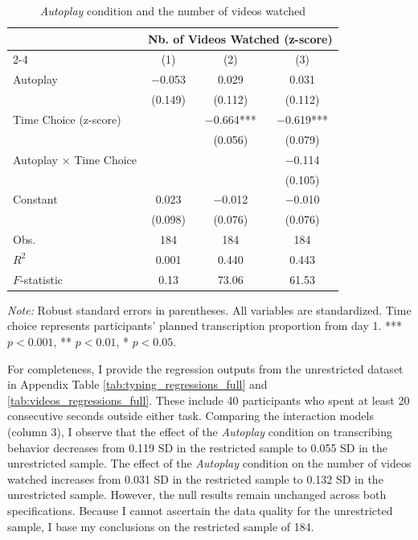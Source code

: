 \documentclass[11pt,a4paper,oneside]{article}
\begin{document}
\begin{table}[H]
  \centering
  \caption{\textit{Autoplay} condition and the number of videos watched}
  \begin{threeparttable}
  \begin{tabular*}{\textwidth}{@{\extracolsep{\fill}}lccc}
  \toprule
  & \multicolumn{3}{c}{Nb. of Videos Watched (z-score)} \\
  \cmidrule(lr){2-4}
  & (1) & (2) & (3) \\
  \midrule
  Autoplay & $-$0.053 & 0.029 & 0.031 \\
  & (0.149) & (0.112) & (0.112) \\
  Time Choice (z-score) & & $-$0.664*** & $-$0.619*** \\
  & & (0.056) & (0.079) \\
  Autoplay × Time Choice & & & $-$0.114 \\
  & & & (0.105) \\
  Constant & 0.023 & $-$0.012 & $-$0.010 \\
  & (0.098) & (0.076) & (0.076) \\
  \midrule
  Obs. & 184 & 184 & 184 \\
  $R^2$ & 0.001 & 0.440 & 0.443 \\
  $F$-statistic & 0.13 & 73.06 & 61.53 \\
  \bottomrule
  \end{tabular*}
  \begin{tablenotes}[flushleft]
  \footnotesize
  \item[] \textit{Note:} Robust standard errors in parentheses. All variables are standardized. Time choice represents participants' planned transcription proportion from day 1. *** $p<0.001$, ** $p<0.01$, * $p<0.05$.
  \end{tablenotes}
  \end{threeparttable}
  \label{tab:videos_regressions}
\end{table}

For completeness, I provide the regression outputs from the unrestricted dataset in Appendix Table \ref{tab:typing_regressions_full} and \ref{tab:videos_regressions_full}. These include 40 participants who spent at least 20 consecutive seconds outside either task. Comparing the interaction models (column 3), I observe that the effect of the \textit{Autoplay} condition on transcribing behavior decreases from 0.119 SD in the restricted sample to 0.055 SD in the unrestricted sample. The effect of the \textit{Autoplay} condition on the number of videos watched increases from 0.031 SD in the restricted sample to 0.132 SD in the unrestricted sample. However, the null results remain unchanged across both specifications. Because I cannot ascertain the data quality for the unrestricted sample, I base my conclusions on the restricted sample of 184.
\end{document}
